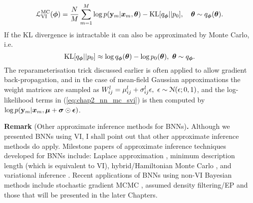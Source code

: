 \begin{equation}
\mathcal{L}_{\text{VI}}^{\text{MC}}(\bm{\phi}) = \frac{N}{M} \sum_{m = 1}^M \log p(\mathbf{y}_m | \bm{x}_m, \bm{\theta}) - \text{KL}[q_{\bm{\phi}}||p_0], \quad \bm{\theta} \sim q_{\bm{\phi}}(\bm{\theta}).
\label{eq:chap2_nn_mc_svi}
\end{equation}
If the KL divergence is intractable it can also be approximated by Monte Carlo, i.e. 
$$\text{KL}[q_{\bm{\phi}}||p_0] \approx \log q_{\bm{\phi}}(\bm{\theta}) - \log p_0(\bm{\theta}), ~ \bm{\theta} \sim q_{\bm{\phi}}.$$
The reparameterisation trick discussed earlier is often applied to allow gradient back-propagation, and in the case of mean-field Gaussian approximations the weight matrices are sampled as $W_{ij}^l = \mu_{ij}^l + \sigma_{ij}^l \epsilon, ~ \epsilon \sim \mathcal{N}(\epsilon; 0, 1)$, and the log-likelihood terms in (\ref{eq:chap2_nn_mc_svi}) is then computed by $\log p(\mathbf{y}_m | \bm{x}_m, \bm{\mu} + \bm{\sigma} \odot \bm{\epsilon}) $.


\vspace{1em}
\begin{tcolorbox}
\textbf{Remark} (Other approximate inference methods for BNNs)\textbf{.}
Although we presented BNNs using VI, I shall point out that other approximate inference methods do apply.
Milestone papers of approximate inference techniques developed for BNNs include: Laplace approximation \citep{mackay:practical1992}, minimum description length \citep{hinton:mdl1993} (which is equivalent to VI), hybrid/Hamiltonian Monte Carlo \citep{neal:thesis1995}, and variational inference \citep{barber:ensemble1998, graves:practical2011, blundell:bnn2015, gal:dropout2016}. Recent applications of BNNs using non-VI Bayesian methods include stochastic gradient MCMC \citep[for example]{korattikara:dark2015, li:sgld_nn2016}, assumed density filtering/EP \citep{hernandez-lobato:pbp2015} and those that will be presented in the later Chapters.
\end{tcolorbox}
